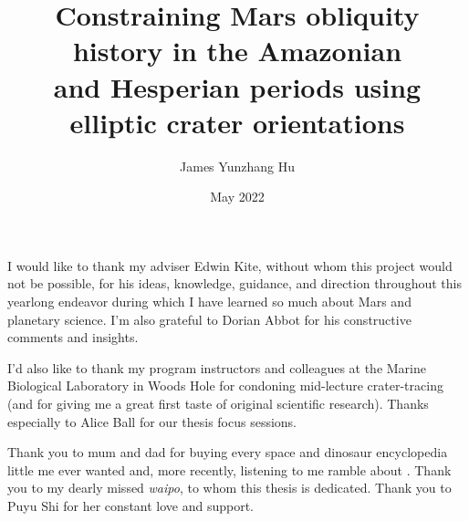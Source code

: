 \documentclass{ucetd}
\title{Constraining Mars obliquity history in the Amazonian\\and Hesperian periods using elliptic crater orientations}
\author{James Yunzhang Hu}
\date{May 2022}
\begin{document}
\maketitle

\makededication


\tableofcontents
\listoffigures
\listoftables

\acknowledgments
I would like to thank my adviser Edwin Kite, without whom this project would not be possible, for his ideas, knowledge, guidance, and direction throughout this yearlong endeavor during which I have learned so much about Mars and planetary science. I’m also grateful to Dorian Abbot for his constructive comments and insights.

I’d also like to thank my program instructors and colleagues at the Marine Biological Laboratory in Woods Hole for condoning mid-lecture crater-tracing (and for giving me a great first taste of original scientific research). Thanks especially to Alice Ball for our thesis focus sessions.

Thank you to mum and dad for buying every space and dinosaur encyclopedia little me ever wanted and, more recently, listening to me ramble about \citet{holo2018a}. Thank you to my dearly missed \textit{waipo}, to whom this thesis is dedicated. Thank you to Puyu Shi for her constant love and support.
\end{document}
